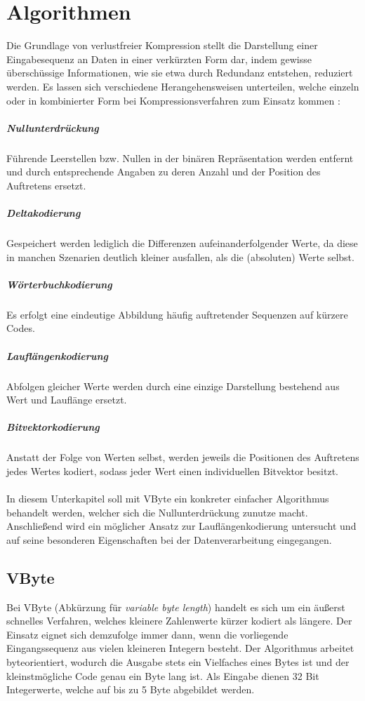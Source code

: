 \section{Algorithmen}

Die Grundlage von verlustfreier Kompression stellt die Darstellung einer Eingabesequenz an Daten in einer verkürzten Form dar, indem gewisse überschüssige Informationen, wie sie etwa durch Redundanz entstehen, reduziert werden. Es lassen sich verschiedene Herangehensweisen unterteilen, welche einzeln oder in kombinierter Form bei Kompressionsverfahren zum Einsatz kommen \cite{Abadi2006}\cite{Croft2009}:

\subparagraph{Nullunterdrückung}
Führende Leerstellen bzw. Nullen in der binären Repräsentation werden entfernt und durch entsprechende Angaben zu deren Anzahl und der Position des Auftretens ersetzt.

\subparagraph{Deltakodierung}
Gespeichert werden lediglich die Differenzen aufeinanderfolgender Werte, da diese in manchen Szenarien deutlich kleiner ausfallen, als die (absoluten) Werte selbst.

\subparagraph{Wörterbuchkodierung}
Es erfolgt eine eindeutige Abbildung häufig auftretender Sequenzen auf kürzere Codes.

\subparagraph{Lauflängenkodierung}
Abfolgen gleicher Werte werden durch eine einzige Darstellung bestehend aus Wert und Lauflänge ersetzt.

\subparagraph{Bitvektorkodierung}
Anstatt der Folge von Werten selbst, werden jeweils die Positionen des Auftretens jedes Wertes kodiert, sodass jeder Wert einen individuellen Bitvektor besitzt.

\paragraph{}
In diesem Unterkapitel soll mit VByte ein konkreter einfacher Algorithmus behandelt werden, welcher sich die Nullunterdrückung zunutze macht. Anschließend wird ein möglicher Ansatz zur Lauflängenkodierung untersucht und auf seine besonderen Eigenschaften bei der Datenverarbeitung eingegangen.

\subsection{VByte}

Bei VByte (Abkürzung für \textit{variable byte length}) handelt es sich um ein äußerst schnelles Verfahren, welches kleinere Zahlenwerte kürzer kodiert als längere. Der Einsatz eignet sich demzufolge immer dann, wenn die vorliegende Eingangssequenz aus vielen kleineren Integern besteht. Der Algorithmus arbeitet byteorientiert, wodurch die Ausgabe stets ein Vielfaches eines Bytes ist und der kleinstmögliche Code genau ein Byte lang ist. Als Eingabe dienen 32 Bit Integerwerte, welche auf bis zu 5 Byte abgebildet werden.

